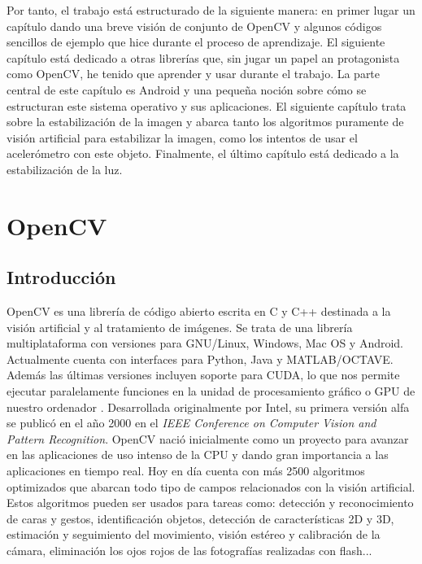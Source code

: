\documentclass[a4paper,openright, 12pt]{book}
\begin{document}
Por tanto, el trabajo está estructurado de la siguiente manera: en primer lugar un capítulo dando una breve visión de conjunto de OpenCV y algunos
códigos sencillos de ejemplo que hice durante el proceso de aprendizaje.
El siguiente capítulo está dedicado a otras librerías que, sin jugar un papel
an protagonista como OpenCV, he tenido que aprender y usar durante el
trabajo. La parte central de este capítulo es Android y una pequeña noción
sobre cómo se estructuran este sistema operativo y sus aplicaciones.
El siguiente capítulo trata sobre la estabilización de la imagen y abarca tanto los algoritmos puramente de visión artificial para estabilizar la imagen, como los intentos de usar el acelerómetro con este objeto. Finalmente, el último capítulo está dedicado a la estabilización de la luz.
\newline

\chapter{OpenCV} \label{cap.opencv}

\section{Introducción}
OpenCV\cite{opencvrefman} es una librería de código abierto escrita en C y C++ destinada a la visión artificial y al tratamiento de imágenes. Se trata de una librería multiplataforma con versiones para GNU/Linux, Windows, Mac OS y Android. Actualmente cuenta con interfaces para Python, Java y MATLAB/OCTAVE. Además las últimas versiones incluyen soporte para CUDA, lo que nos permite ejecutar paralelamente funciones en la unidad de procesamiento gráfico o GPU de nuestro ordenador .
Desarrollada originalmente por Intel, su primera versión alfa se publicó en el año 2000 en el \textit{IEEE Conference on Computer Vision and Pattern Recognition}. OpenCV nació inicialmente como un proyecto para avanzar en las aplicaciones de uso intenso de la CPU y dando gran importancia a las aplicaciones en tiempo real. Hoy en día cuenta con más 2500 algoritmos optimizados que abarcan todo tipo de campos relacionados con la visión artificial.
Estos algoritmos pueden ser usados para tareas como: detección y reconocimiento de caras y gestos, identificación objetos, detección de características 2D y 3D, estimación y seguimiento del movimiento, visión estéreo y calibración de la cámara, eliminación los ojos rojos de las fotografías realizadas con flash...
\end{document}
